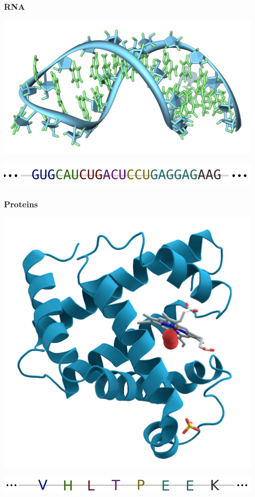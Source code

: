 \documentclass[handout]{beamer}
\numberwithin{equation}{section}
\begin{document}
\begin{frame}
\frametitle{RNA}
\begin{center}
\includegraphics[scale=.07]{fig/rna-img.png}
\end{center}
\begin{center}
\includegraphics[scale=.23]{fig/rna.png}
\end{center}
\end{frame}


\begin{frame}
\frametitle{Proteins}
\begin{center}
\includegraphics[scale=.07]{fig/myo.png}
\end{center}
\begin{center}
\includegraphics[scale=.23]{fig/protein.png}
\end{center}
\end{frame}
\end{document}
